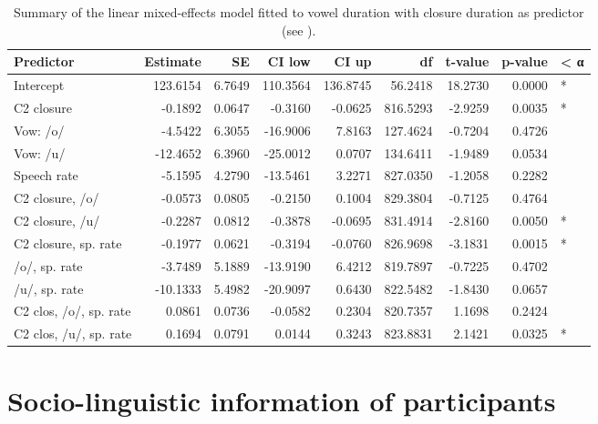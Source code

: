 \documentclass[12pt,]{article}
\begin{document}
\begin{table}

\caption{\label{tab:vow-clo-table}Summary of the linear mixed-effects model fitted to vowel duration with closure duration as predictor (see ).}
\centering
\begin{tabular}[t]{lrrrrrrrl}
\toprule
Predictor & Estimate & SE & CI low & CI up & df & t-value & p-value & < α\\
\midrule
Intercept & 123.6154 & 6.7649 & 110.3564 & 136.8745 & 56.2418 & 18.2730 & 0.0000 & *\\
C2 closure & -0.1892 & 0.0647 & -0.3160 & -0.0625 & 816.5293 & -2.9259 & 0.0035 & *\\
Vow: /o/ & -4.5422 & 6.3055 & -16.9006 & 7.8163 & 127.4624 & -0.7204 & 0.4726 & \\
Vow: /u/ & -12.4652 & 6.3960 & -25.0012 & 0.0707 & 134.6411 & -1.9489 & 0.0534 & \\
Speech rate & -5.1595 & 4.2790 & -13.5461 & 3.2271 & 827.0350 & -1.2058 & 0.2282 & \\
\addlinespace
C2 closure, /o/ & -0.0573 & 0.0805 & -0.2150 & 0.1004 & 829.3804 & -0.7125 & 0.4764 & \\
C2 closure, /u/ & -0.2287 & 0.0812 & -0.3878 & -0.0695 & 831.4914 & -2.8160 & 0.0050 & *\\
C2 closure, sp. rate & -0.1977 & 0.0621 & -0.3194 & -0.0760 & 826.9698 & -3.1831 & 0.0015 & *\\
/o/, sp. rate & -3.7489 & 5.1889 & -13.9190 & 6.4212 & 819.7897 & -0.7225 & 0.4702 & \\
/u/, sp. rate & -10.1333 & 5.4982 & -20.9097 & 0.6430 & 822.5482 & -1.8430 & 0.0657 & \\
\addlinespace
C2 clos, /o/, sp. rate & 0.0861 & 0.0736 & -0.0582 & 0.2304 & 820.7357 & 1.1698 & 0.2424 & \\
C2 clos, /u/, sp. rate & 0.1694 & 0.0791 & 0.0144 & 0.3243 & 823.8831 & 2.1421 & 0.0325 & *\\
\bottomrule
\end{tabular}
\end{table}

\hypertarget{socio-linguistic-information-of-participants}{%
\section{Socio-linguistic information of
participants}\label{socio-linguistic-information-of-participants}}

\label{a:socioling}
\end{document}
